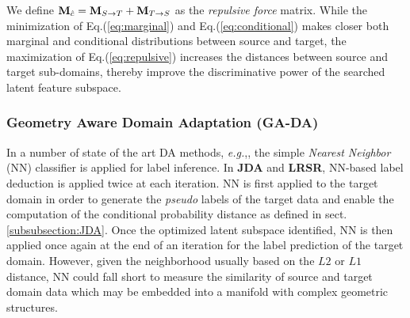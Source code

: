 \documentclass[journal,twocolumn]{IEEEtran}
\begin{document}
\begin{CJK*}{UTF8}{gkai}
We define ${{\bf{M}}_{\hat c}} = {{\bf{M}}_{S \to T}} + {{\bf{M}}_{T \to S}}$ as the \textit{repulsive force} matrix.%
While the minimization of Eq.(\ref{eq:marginal}) and Eq.(\ref{eq:conditional}) makes closer both marginal and conditional distributions between source and target, the maximization of Eq.(\ref{eq:repulsive}) increases the  distances between source and target sub-domains, thereby improve the discriminative power of the searched latent feature subspace. 
						
						
						
\subsubsection{Geometry Aware Domain Adaptation (\textbf{GA-DA})}
\label{subsubsection:GA-DA}
In a number of state of the art DA methods, \textit{e.g.},\cite{pan2008transfer,pan2011domain,long2013transfer}, the simple \textit{Nearest Neighbor} (NN) classifier is applied for label inference. In \textbf{JDA} and \textbf{LRSR}\cite{DBLP:journals/tip/XuFWLZ16}, NN-based label deduction is applied twice at each iteration. NN is first applied to the target domain in order to generate the \emph{pseudo} labels of the target data and enable the computation of the conditional probability distance as defined in sect. \ref{subsubsection:JDA}. Once the optimized latent subspace  identified, NN is then applied once again at the end of an iteration for the label prediction of the target domain. However, given the neighborhood  usually based on the $L2$ or $L1$ distance, NN could fall short to measure the similarity of source and target domain data which may be embedded into a manifold with complex geometric structures.


\end{CJK*}
\end{document}
